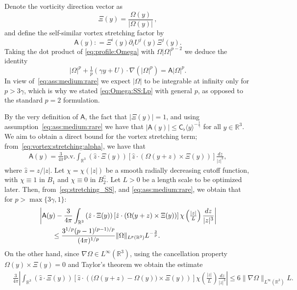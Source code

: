 \documentclass[11pt,reqno]{amsproc}
\numberwithin{equation}{section}
\theoremstyle{remark}
\begin{document}
Denote the vorticity direction vector as
\[
\Xi(y) = \frac{\Omega(y)}{|\Omega(y)|}
\,,
\]
and  define the self-similar vortex stretching factor by
\[
\mathsf{A}(y): = \Xi^i(y) \partial_i U^j(y) \Xi^j(y)
.
\]
Taking the dot product of \eqref{eq:profile:Omega}  with $\Omega |\Omega|^{p-2}$ we deduce the identity
\begin{equation}
|\Omega|^p +  \tfrac 1p (\gamma y + U ) \cdot \nabla (|\Omega|^p) = \mathsf{A} |\Omega|^p 
.
\label{eq:Omega:SS:Lp}
\end{equation}
In view of~\eqref{eq:ass:medium:rare} we expect $|\Omega|$ to be integrable at infinity only for $p > 3\gamma$, which is why we stated \eqref{eq:Omega:SS:Lp} with general $p$, as opposed to the standard $p=2$ formulation.


By the very definition of $\mathsf{A}$, the fact that $|\Xi(y)|=1$, and using assumption~\eqref{eq:ass:medium:rare} we have that $|\mathsf{A}(y)|\leq \mathsf{C}_\flat \langle y \rangle^{-\frac{1}{\gamma}}$ for all $y\in \mathbb{R}^3$. We aim to obtain a direct bound for the vortex stretching term; from~\eqref{eq:vortex:stretching:alpha}, we have that 
\begin{align}
\mathsf{A}(y)
= \frac{3}{4\pi} \text{p.v.} \int_{\mathbb{R}^3} \left(\hat{z} \cdot \Xi(y)\right) \left[\hat{z} \cdot \left(\Omega(y+z) \times \Xi(y)\right)\right] \frac{dz}{|z|^3}
\label{eq:stretching_SS}
,
\end{align}
where $\hat{z} = z/|z|$.  
Let $\chi = \chi(|z|)$ be a smooth radially decreasing cutoff function, with $\chi \equiv 1$ in $B_1$ and $\chi \equiv 0$ in $B_2^\complement$. Let $L>0$ be a length scale to be optimized later. Then, from~\eqref{eq:stretching_SS},  and \eqref{eq:ass:medium:rare},  we obtain that for $p > \max\{3\gamma,1\}$: 
\begin{align}
&\left| \mathsf{A}(y)
- \frac{3}{4\pi} \int_{\mathbb{R}^3} \left(\hat{z} \cdot \Xi(y)\right) \left[\hat{z} \cdot \left(  \Omega(y+z)   \times \Xi(y)\right)\right]  \chi\left( \tfrac{|z|}{L} \right) \frac{dz}{|z|^3}
\right|
\notag\\
&\qquad
\leq 
\frac{3^{1/p} (p-1)^{(p-1)/p} }{(4\pi)^{1/p}}  \|\Omega\|_{L^p(\mathbb{R}^3)}  L^{-\frac 3p}
.
\label{eq:stretching_SS_2p}
\end{align}
On the other hand,  since $\nabla \Omega \in L^\infty(\mathbb{R}^3)$, using the cancellation property $\Omega(y) \times \Xi(y) = 0$ and Taylor's theorem we obtain the estimate
\begin{align}
&\frac{3}{4\pi} \left| \int_{\mathbb{R}^3} \left(\hat{z} \cdot \Xi(y)\right) \left[\hat{z} \cdot \left( \bigl( \Omega(y+z) - \Omega(y) \bigr) \times \Xi(y)\right)\right] \chi\left( \tfrac{|z|}{L} \right) \frac{dz}{|z|^3}
\right|
\leq 
6 \|\nabla \Omega\|_{L^\infty(\mathbb{R}^3)}  L
.
\label{eq:stretching_SS_3p}
\end{align}
\end{document}
